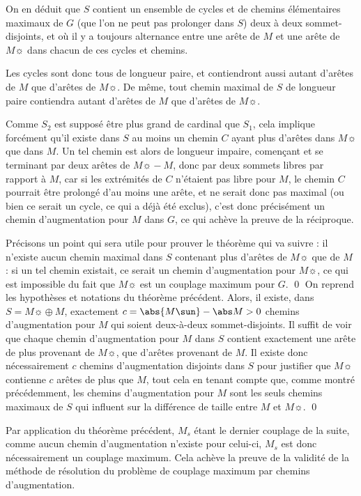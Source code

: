     On en déduit que $S$ contient un ensemble de cycles et de chemins élémentaires maximaux de $G$ (que l'on ne peut pas prolonger dans $S$) deux à deux sommet-disjoints, et où il y a toujours alternance entre une arête de $M$ et une arête de $M\sun$ dans chacun de ces cycles et chemins.
    
    Les cycles sont donc tous de longueur paire, et contiendront aussi autant d'arêtes de $M$ que d'arêtes de $M\sun$. De même, tout chemin maximal de $S$ de longueur paire contiendra autant d'arêtes de $M$ que d'arêtes de $M\sun$.
    
    Comme $S_2$ est supposé être plus grand de cardinal que $S_1$, cela implique forcément qu'il existe dans $S$ au moins un chemin $C$ ayant plus d'arêtes dans $M\sun$ que dans $M$. Un tel chemin est alors de longueur impaire, començant et se terminant par deux arêtes de $M\sun \minus M$, donc par deux sommets libres par rapport à $M$, car si les extrémités de $C$ n'étaient pas libre pour $M$, le chemin $C$ pourrait être prolongé d'au moins une arête, et ne serait donc pas maximal (ou bien ce serait un cycle, ce qui a déjà été exclus), c'est donc précisément un chemin d'augmentation pour $M$ dans $G$, ce qui achève la preuve de la réciproque.
    
    Précisons un point qui sera utile pour prouver le théorème qui va suivre : il n'existe aucun chemin maximal dans $S$ contenant plus d'arêtes de $M\sun$ que de $M$ : si un tel chemin existait, ce serait un chemin d'augmentation pour $M\sun$, ce qui est impossible du fait que $M\sun$ est un couplage maximum pour $G$.
 \qed\SEP
  On reprend les hypothèses et notations du théorème précédent. Alors, il existe, dans $S = M\sun \oplus M$, exactement $c = \abs {M\sun} - \abs M > 0$ chemins d'augmentation pour $M$ qui soient deux-à-deux sommet-disjoints.
 \SEP\jpreuve
    Il suffit de voir que chaque chemin d'augmentation pour $M$ dans $S$ contient exactement une arête de plus provenant de $M\sun$, que d'arêtes provenant de $M$. Il existe donc nécessairement $c$ chemins d'augmentation disjoints dans $S$ pour justifier que $M\sun$ contienne $c$ arêtes de plus que $M$, tout cela en tenant compte que, comme montré précédemment, les chemins d'augmentation pour $M$ sont les seuls chemins maximaux de $S$ qui influent sur la différence de taille entre $M$ et $M\sun$.
 \qed \SEP
 
 Par application du théorème précédent, $M_s$ étant le dernier couplage de la suite, comme aucun chemin d'augmentation n'existe pour celui-ci, $M_s$ est donc nécessairement un couplage maximum. Cela achève la preuve de la validité de la méthode de résolution du problème de couplage maximum par chemins d'augmentation.
 
